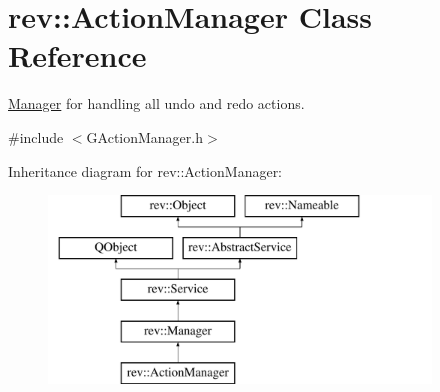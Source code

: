 \hypertarget{classrev_1_1_action_manager}{}\section{rev\+::Action\+Manager Class Reference}
\label{classrev_1_1_action_manager}


\mbox{\hyperlink{classrev_1_1_manager}{Manager}} for handling all undo and redo actions.  




{\ttfamily \#include $<$G\+Action\+Manager.\+h$>$}

Inheritance diagram for rev\+::Action\+Manager\+:\begin{figure}[H]
\begin{center}
\leavevmode
\includegraphics[height=5.000000cm]{classrev_1_1_action_manager}
\end{center}
\end{figure}
